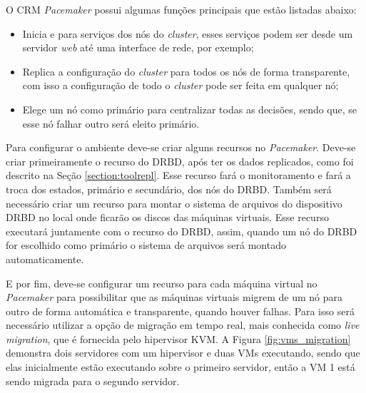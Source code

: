 O \ac{CRM} \textit{Pacemaker} possui algumas funções principais que estão listadas abaixo:
\begin{itemize}
 \item Inicia e para serviços dos nós do \textit{cluster}, esses serviços podem ser desde um servidor \textit{web} até uma interface de rede, 
 por exemplo;
 \item Replica a configuração do \textit{cluster} para todos os nós de forma transparente, com isso a configuração de todo o \textit{cluster} 
 pode ser feita em qualquer nó;
 \item Elege um nó como primário para centralizar todas as decisões, sendo que, se esse nó falhar outro será eleito primário.
\end{itemize}

Para configurar o ambiente deve-se criar alguns recursos no \textit{Pacemaker}.
Deve-se criar primeiramente o recurso do \ac{DRBD}, após ter os dados replicados, como foi descrito na Seção \ref{section:toolrepl}. Esse recurso 
fará o monitoramento e fará a troca dos estados, primário e secundário, dos nós do \ac{DRBD}.
Também será necessário criar um recurso para montar o sistema de arquivos do dispositivo \ac{DRBD} no local onde ficarão os discos das máquinas
virtuais. Esse recurso executará juntamente com o recurso do \ac{DRBD}, assim, quando um nó do \ac{DRBD} for escolhido como primário o sistema de
arquivos será montado automaticamente.

E por fim, deve-se configurar um recurso para cada máquina virtual no \textit{Pacemaker} para possibilitar que as
máquinas virtuais migrem de um nó para outro de forma automática e transparente, quando houver falhas. Para isso será necessário utilizar a 
opção de migração em tempo real, mais conhecida como \textit{live migration}, que é fornecida pelo hipervisor \ac{KVM}.
A Figura \ref{fig:vms_migration} demonstra dois servidores com um hipervisor e duas \ac{VM}s executando, sendo que elas inicialmente estão 
executando sobre o primeiro servidor, então a \ac{VM} 1 está sendo migrada para o segundo servidor.


